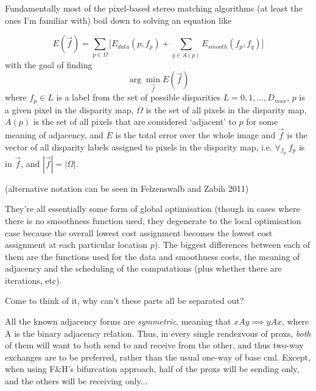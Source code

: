 \glsresetall

\chapter{}

Fundamentally most of the pixel-based stereo matching algorithms (at least the ones I'm familiar with) boil down to solving an equation like

\[ E(\vec{f}) = \sum_{p \in \Omega} \Bigg[ E_{data}(p, f_p) + \sum_{q \in A(p)} E_{smooth}(f_p, f_q)\Bigg] \] with the goal of finding
\[ \arg\min_{\vec{f}} E(\vec{f})\] where \(f_p \in L\) is a label from the set of possible disparities \(L = 0, 1, \ldots, D_{max}\), \(p\) is a given pixel in the disparity map, \(\Omega\) is the set of all pixels in the disparity map, \(A(p)\) is the set of all pixels that are considered `adjacent' to \(p\) for some meaning of adjacency, and \(E\) is the total error over the whole image and \(\vec{f}\) is the vector of all disparity labels assigned to pixels in the disparity map, i.e. \( \forall_{f_p}~f_p\) is in \(\vec{f}\), and \(|\vec{f}| = |\Omega|\).

(alternative notation can be seen in Felzenswalb and Zabih 2011)

They're all essentially some form of global optimisation (though in cases where there is no smoothness function used, they degenerate to the local optimisation case because the overall lowest cost assignment becomes the lowest cost assignment at each particular location \(p\)).  The biggest differences between each of them are the functions used for the data and smoothness costs, the meaning of adjacency and the scheduling of the computations (plus whether there are iterations, etc).

Come to think of it, why can't these parts all be separated out?

All the known adjacency forms are \emph{symmetric}, meaning that \(x A y \implies y A x\), where A is the binary adjacency relation.  Thus, in every single rendezvous of \glspl{prox}, \emph{both} of them will want to both send to and receive from the other, and thus two-way exchanges are to be preferred, rather than the usual one-way of base \gls{cml}.  Except, when using F\&H's bifurcation approach, half of the \glspl{prox} will be sending only, and the others will be receiving only...

